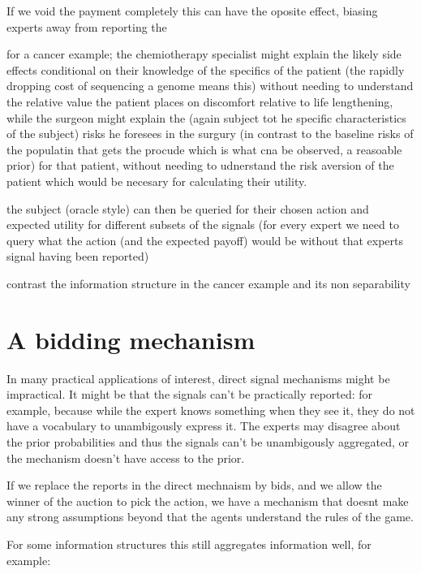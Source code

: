 If we void the payment completely this can have the oposite effect, biasing experts away from reporting the 


for a cancer example; the chemiotherapy specialist might explain the likely side effects conditional on their knowledge of the specifics of the patient (the rapidly dropping cost of sequencing a genome means this) without needing to understand the relative value the patient places on discomfort relative to life lengthening, while the surgeon might explain the (again subject tot he specific characteristics of the subject) risks he foresees in the surgury (in contrast to the baseline risks of the populatin that gets the procude which is what cna be observed, a reasoable prior) for that patient, without needing to udnerstand the risk aversion of the patient which would be necesary for calculating their utility.

the subject (oracle style) can then be queried for their chosen action and expected utility for different subsets of the signals (for every expert we need to query what the action (and the expected payoff) would be without that experts signal having been reported)

contrast the information structure in the cancer example and its non separability 


\section{A bidding mechanism }

In many practical applications of interest, direct signal mechanisms might be impractical. It might be that the signals can't be practically reported: for example, because while the expert knows something when they see it, they do not have a vocabulary to unambigously express it. The experts may disagree about the prior probabilities and thus the signals can't be unambigously aggregated, or the mechanism doesn't have access to the prior.


If we replace the reports in the direct mechnaism by bids, and we allow the winner of the auction to pick the action, we have a mechanism that doesnt make any strong assumptions beyond that the agents understand the rules of the game.

For some information structures this still aggregates information well, for example:

